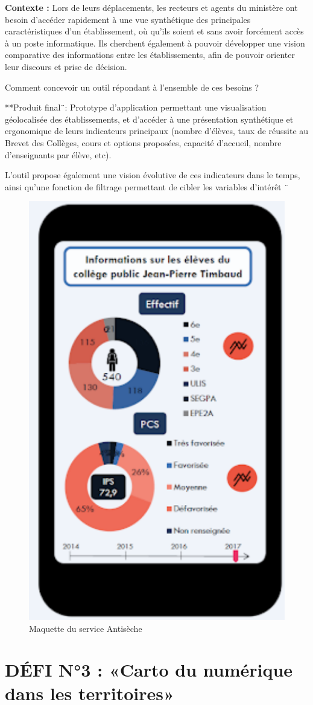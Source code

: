 \documentclass[]{book}
\begin{document}
\textbf{Contexte : }Lors de leurs déplacements, les recteurs et agents
du ministère ont besoin d'accéder rapidement à une vue synthétique des
principales caractéristiques d'un établissement, où qu'ils soient et
sans avoir forcément accès à un poste informatique. Ils cherchent
également à pouvoir développer une vision comparative des informations
entre les établissements, afin de pouvoir orienter leur discours et
prise de décision.

Comment concevoir un outil répondant à l'ensemble de ces besoins ?

**Produit final¨: Prototype d'application permettant une visualisation
géolocalisée des établissements, et d'accéder à une présentation
synthétique et ergonomique de leurs indicateurs principaux (nombre
d'élèves, taux de réussite au Brevet des Collèges, cours et options
proposées, capacité d'accueil, nombre d'enseignants par élève, etc).

L'outil propose également une vision évolutive de ces indicateurs dans
le temps, ainsi qu'une fonction de filtrage permettant de cibler les
variables d'intérêt ¨

\begin{figure}

{\centering \includegraphics[width=0.4\linewidth]{./img/antiseche} 

}

\caption{Maquette du service Antisèche}\label{fig:unnamed-chunk-10}
\end{figure}

\section{DÉFI N°3 : «Carto du numérique dans les
territoires»}\label{defi-n3-carto-du-numerique-dans-les-territoires}
\end{document}

